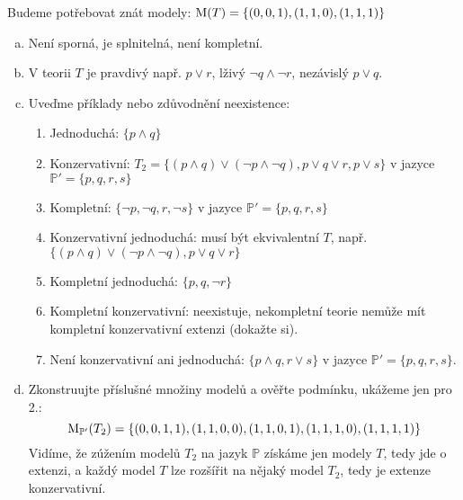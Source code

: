 \begin{problem}
    \begin{solution}
        Budeme potřebovat znát modely: $\operatorname{M}(T)=\{(0,0,1),(1,1,0),(1,1,1)\}$
        \begin{enumerate}[(a)]
            \item Není sporná, je splnitelná, není kompletní.
            \item V teorii $T$ je pravdivý např. $p\lor r$, lživý $\neg q\land\neg r$, nezávislý $p\lor q$.  
            \item Uveďme příklady nebo zdůvodnění neexistence:
            \begin{enumerate}[1.]
                \item Jednoduchá: $\{p\land q\}$
                \item Konzervativní: $T_2=\{(p\land q)\lor(\neg p\land\neg q), p\lor q\lor r,p\lor s\}$ v jazyce $\mathbb P'=\{p,q,r,s\}$
                \item Kompletní: $\{\neg p,\neg q,r,\neg s\}$ v jazyce $\mathbb P'=\{p,q,r,s\}$
                \item Konzervativní jednoduchá: musí být ekvivalentní $T$, např. $\{(p\land q)\lor(\neg p\land\neg q), p\lor q\lor r\}$
                \item Kompletní jednoduchá: $\{p,q,\neg r\}$
                \item Kompletní konzervativní: neexistuje, nekompletní teorie nemůže mít kompletní konzervativní extenzi (dokažte si).
                \item Není konzervativní ani jednoduchá: $\{p\land q,r\lor s\}$ v jazyce $\mathbb P'=\{p,q,r,s\}$.
            \end{enumerate}
            \item Zkonstruujte příslušné množiny modelů a ověřte podmínku, ukážeme jen pro 2.:
            $$
            \operatorname{M}_{\mathbb P'}(T_2)=\{(0,0,1,1),(1,1,0,0),(1,1,0,1),(1,1,1,0),(1,1,1,1)\}
            $$
            Vidíme, že zúžením modelů $T_2$ na jazyk $\mathbb P$ získáme jen modely $T$, tedy jde o extenzi, a každý model $T$ lze rozšířit na nějaký model $T_2$, tedy je extenze konzervativní.
        \end{enumerate}
            
    \end{solution}
    
\end{problem}


